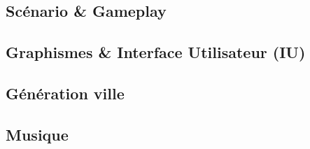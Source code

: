 \documentclass[a4paper,10pt]{article}
\begin{document}
\subsection{Scénario \& Gameplay}
\subsection{Graphismes \& Interface Utilisateur (IU)}
\subsection{Génération ville}
\subsection{Musique}
\end{document}
